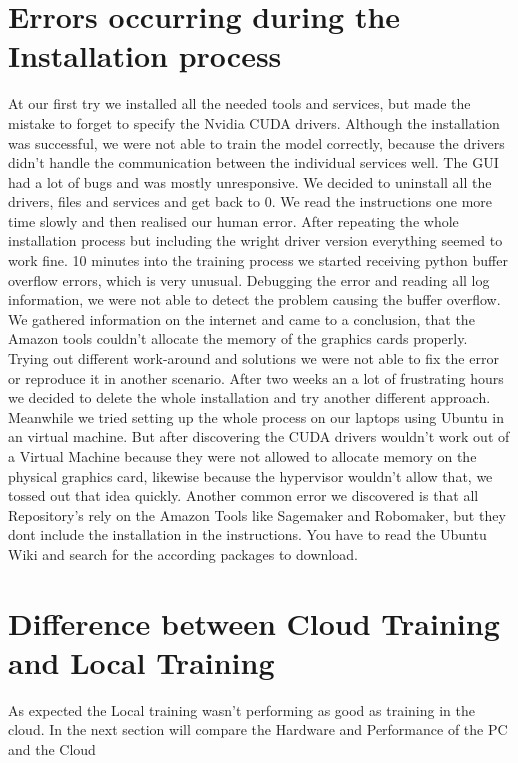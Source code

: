 \section{Errors occurring during the Installation process}
At our first try we installed all the needed tools and services, but made the mistake to forget to specify the Nvidia CUDA drivers. Although the installation was successful, we were not able to train the model correctly, because the drivers didn't handle the communication between the individual services well. The GUI had a lot of bugs and was mostly unresponsive. We decided to uninstall all the drivers, files and services and get back to 0. We read the instructions one more time slowly and then realised our human error. After repeating the whole installation process but including the wright driver version everything seemed to work fine. 10 minutes into the training process we started receiving python buffer overflow errors, which is very unusual. Debugging the error and reading all log information, we were not able to detect the problem causing the buffer overflow. We gathered information on the internet and came to a conclusion, that the Amazon tools couldn't allocate the memory of the graphics cards properly. Trying out different work-around and solutions we were not able to fix the error or reproduce it in another scenario. After two weeks an a lot of frustrating hours we decided to delete the whole installation and try another different approach. \newline Meanwhile we tried setting up the whole process on our laptops using Ubuntu in an virtual machine. But after discovering the CUDA drivers wouldn't work out of a Virtual Machine because they were not allowed to allocate memory on the physical graphics card, likewise because the hypervisor wouldn't allow that, we tossed out that idea quickly. \newline Another common error we discovered  is that all Repository's rely on the Amazon Tools like Sagemaker and Robomaker, but they dont include the installation in the instructions. You have to read the Ubuntu Wiki and search for the according packages to download.

\section{Difference between Cloud Training and Local Training}
As expected the Local training wasn't performing as good as training in the cloud. In the next section will compare the Hardware and Performance of the PC and the Cloud 

